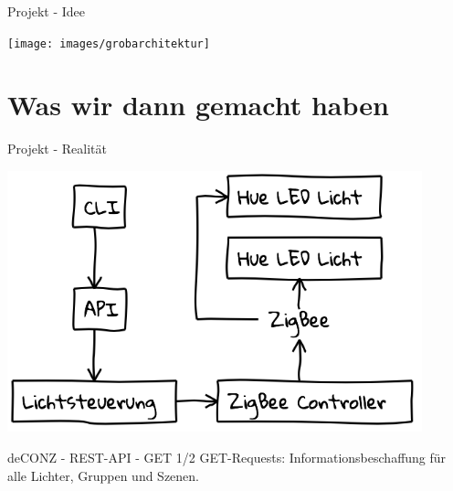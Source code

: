 \begin{frame}{Projekt - Idee}
  \begin{center}
    \texttt{[image: images/grobarchitektur]}
  \end{center}
\end{frame}

\section{Was wir dann gemacht haben}

\begin{frame}{Projekt - Realität}
  \begin{center}
    \includegraphics[width=0.9\textwidth]{images/realworld}
  \end{center}
\end{frame}

\begin{frame}{deCONZ - REST-API - GET 1/2}
  \Large
  GET-Requests: Informationsbeschaffung
  \flushleft
  für \alert{alle} Lichter, Gruppen und Szenen.
\end{frame}

